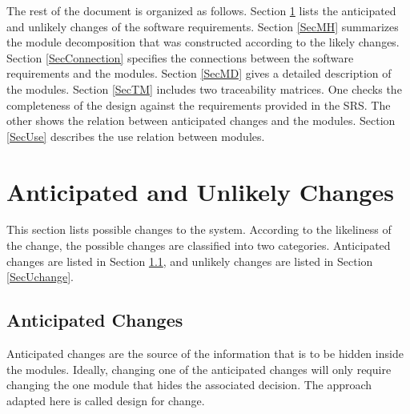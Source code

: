 \documentclass[12pt, titlepage]{article}
\begin{document}
The rest of the document is organized as follows. Section \ref{SecChange} lists
the anticipated and unlikely changes of the software requirements. Section
\ref{SecMH} summarizes the module decomposition that was constructed according
to the likely changes. Section \ref{SecConnection} specifies the connections
between the software requirements and the modules. Section \ref{SecMD} gives a
detailed description of the modules. Section \ref{SecTM} includes two
traceability matrices. One checks the completeness of the design against the
requirements provided in the SRS. The other shows the relation between
anticipated changes and the modules. Section \ref{SecUse} describes the use
relation between modules.

\section{Anticipated and Unlikely Changes} \label{SecChange}

This section lists possible changes to the system. According to the likeliness
of the change, the possible changes are classified into two categories.
Anticipated changes are listed in Section \ref{SecAchange}, and unlikely changes
are listed in Section \ref{SecUchange}.

\subsection{Anticipated Changes} \label{SecAchange}

Anticipated changes are the source of the information that is to be hidden
inside the modules. Ideally, changing one of the anticipated changes will only
require changing the one module that hides the associated decision. The approach
adapted here is called design for change.
\end{document}
